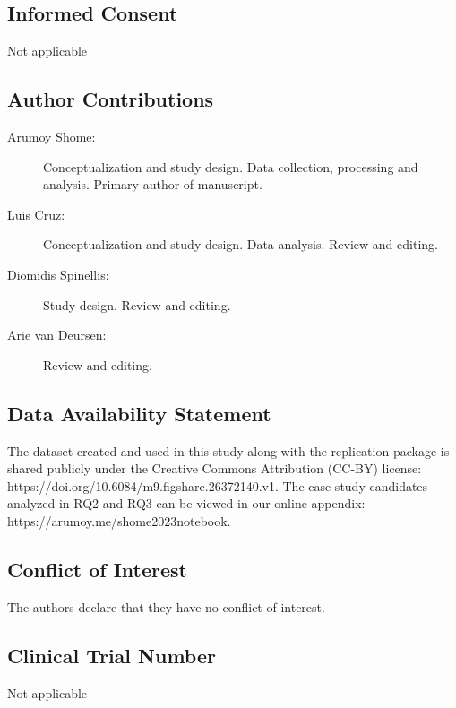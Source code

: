 \documentclass[smallextended]{svjour3}       %
\begin{document}
\subsection{Informed Consent}
Not applicable

\subsection{Author Contributions}
\begin{description}
  \item[Arumoy Shome:] Conceptualization and study design. Data collection, processing and analysis. Primary author of manuscript.
  \item[Luis Cruz:] Conceptualization and study design. Data analysis. Review and editing.
  \item[Diomidis Spinellis:] Study design. Review and editing.
  \item[Arie van Deursen:] Review and editing.
\end{description}

\subsection{Data Availability Statement}
The dataset created and used in this study along with the replication package is shared publicly under the Creative Commons Attribution (CC-BY) license: https://doi.org/10.6084/m9.figshare.26372140.v1. The case study candidates analyzed in RQ2 and RQ3 can be viewed in our online appendix: https://arumoy.me/shome2023notebook.

\subsection{Conflict of Interest}
The authors declare that they have no conflict of interest.

\subsection{Clinical Trial Number}
Not applicable

\end{document}
